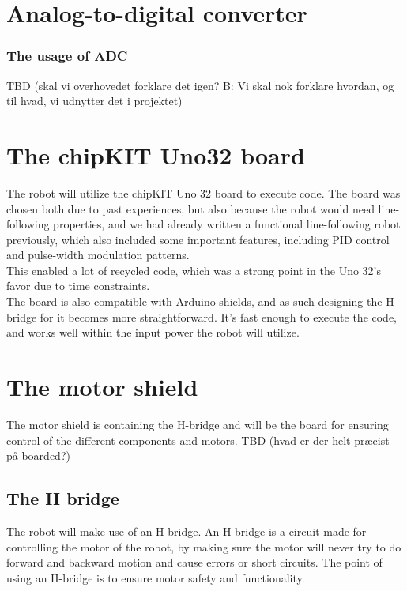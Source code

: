 
\section{Analog-to-digital converter}





\subsubsection{The usage of ADC}
TBD (skal vi overhovedet forklare det igen? B: Vi skal nok forklare hvordan, og til hvad, vi udnytter det i projektet)

\section{The chipKIT Uno32 board}
The robot will utilize the chipKIT Uno 32 board to execute code. The board
was chosen both due to past experiences, but also because the robot would need
line-following properties, and we had already written a functional line-following robot
previously, which also included some important features, including PID control and 
pulse-width modulation patterns. \\
This enabled a lot of recycled code, which was a strong point
in the Uno 32's favor due to time constraints. \\

The board is also compatible with Arduino shields, and as such designing the H-bridge for it
becomes more straightforward. It's fast enough to execute the code, and works well within the
input power the robot will utilize.

\section{The motor shield}
The motor shield is containing the H-bridge and will be the board for ensuring control of the different components and motors.
TBD (hvad er der helt præcist på boarded?)

\subsection{The H bridge}
The robot will make use of an H-bridge. An H-bridge is a circuit made for controlling the motor of the robot, by making sure the motor will never try to do forward and backward motion  and cause errors or short circuits. The point of using an H-bridge is to ensure motor safety and functionality.

